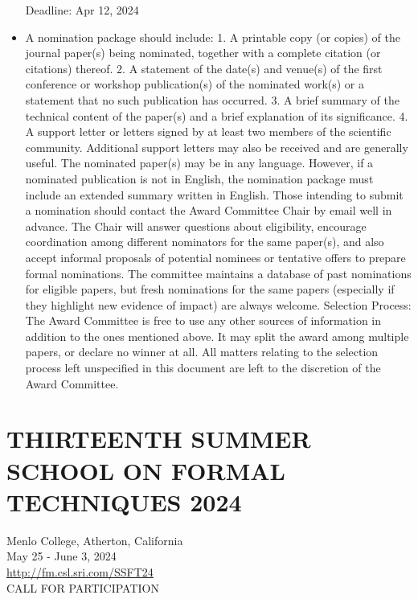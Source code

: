 \documentclass[prodmode,acmtecs]{acmsmall} %
\begin{document}
\begin{itemize}
Deadline: Apr 12, 2024 
 
\item  A nomination package should include: 1. A printable copy (or copies) of the journal paper(s) being nominated, together with a complete citation (or citations) thereof. 2. A statement of the date(s) and venue(s) of the first conference or workshop publication(s) of the nominated work(s) or a statement that no such publication has occurred. 3. A brief summary of the technical content of the paper(s) and a brief explanation of its significance. 4. A support letter or letters signed by at least two members of the scientific community. Additional support letters may also be received and are generally useful. The nominated paper(s) may be in any language. However, if a nominated publication is not in English, the nomination package must include an extended summary written in English. Those intending to submit a nomination should contact the Award Committee Chair by email well in advance. The Chair will answer questions about eligibility, encourage coordination among different nominators for the same paper(s), and also accept informal proposals of potential nominees or tentative offers to prepare formal nominations. The committee maintains a database of past nominations for eligible papers, but fresh nominations for the same papers (especially if they highlight new evidence of impact) are always welcome. Selection Process: The Award Committee is free to use any other sources of information in addition to the ones mentioned above. It may split the award among multiple papers, or declare no winner at all. All matters relating to the selection process left unspecified in this document are left to the discretion of the Award Committee. 
 
\end{itemize}\section{THIRTEENTH SUMMER SCHOOL ON FORMAL TECHNIQUES 2024 }\label{THIRTEENTHSUMMERSCHOOLONFORMALTECHNIQUES2024}  Menlo College, Atherton, California\\ 
  May 25 - June 3, 2024 \\ 
  \href{http://fm.csl.sri.com/SSFT24}{http://fm.csl.sri.com/SSFT24}\\ 
CALL FOR PARTICIPATION 
\end{document}
